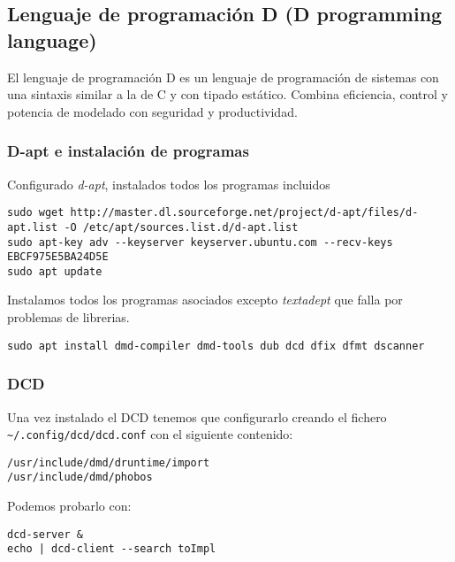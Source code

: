 \documentclass[
  12pt,
  spanish,
]{article}
\begin{document}
\hypertarget{lenguaje-de-programaciuxf3n-d-d-programming-language}{%
\subsection{Lenguaje de programación D (D programming
language)}\label{lenguaje-de-programaciuxf3n-d-d-programming-language}}

El lenguaje de programación D es un lenguaje de programación de sistemas
con una sintaxis similar a la de C y con tipado estático. Combina
eficiencia, control y potencia de modelado con seguridad y
productividad.

\hypertarget{d-apt-e-instalaciuxf3n-de-programas}{%
\subsubsection{D-apt e instalación de
programas}\label{d-apt-e-instalaciuxf3n-de-programas}}

Configurado \emph{d-apt}, instalados todos los programas incluidos

\begin{verbatim}
sudo wget http://master.dl.sourceforge.net/project/d-apt/files/d-apt.list -O /etc/apt/sources.list.d/d-apt.list
sudo apt-key adv --keyserver keyserver.ubuntu.com --recv-keys  EBCF975E5BA24D5E
sudo apt update
\end{verbatim}

Instalamos todos los programas asociados excepto \emph{textadept} que
falla por problemas de librerias.

\begin{verbatim}
sudo apt install dmd-compiler dmd-tools dub dcd dfix dfmt dscanner
\end{verbatim}

\hypertarget{dcd}{%
\subsubsection{DCD}\label{dcd}}

Una vez instalado el DCD tenemos que configurarlo creando el fichero
\texttt{\textasciitilde{}/.config/dcd/dcd.conf} con el siguiente
contenido:

\begin{verbatim}
/usr/include/dmd/druntime/import
/usr/include/dmd/phobos
\end{verbatim}

Podemos probarlo con:

\begin{verbatim}
dcd-server &
echo | dcd-client --search toImpl
\end{verbatim}
\end{document}
